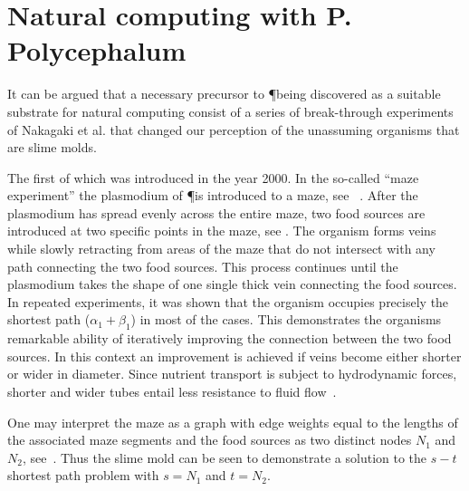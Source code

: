 \section{Natural computing with P. Polycephalum}

	It can be argued that a necessary precursor to \P being discovered as a suitable substrate for natural computing consist of a series of break-through experiments of Nakagaki et al. that changed our perception of the unassuming organisms that are slime molds.
	
	The first of which was introduced in the year 2000. In the so-called ``maze experiment'' the plasmodium of \P is introduced to a maze, see ~\cite{nakagaki2000intelligence}. After the plasmodium has spread evenly across the entire maze, two food sources are introduced at two specific points in the maze, see . The organism forms veins while slowly retracting from areas of the maze that do not intersect with any path connecting the two food sources. This process continues until the plasmodium takes the shape of one single thick vein connecting the food sources. In repeated experiments, it was shown that the organism occupies precisely the shortest path ($\alpha_1 + \beta_1$) in most of the cases. This demonstrates the organisms remarkable ability of iteratively improving the connection between the two food sources.
	In this context an improvement is achieved if veins become either shorter or wider in diameter. Since nutrient transport is subject to hydrodynamic forces, shorter and wider tubes entail less resistance to fluid flow~\cite{kamiya1959motive}.

	One may interpret the maze as a graph with edge weights equal to the lengths of the associated maze segments and the food sources as two distinct nodes $N_1$ and $N_2$, see~. Thus the slime mold \Pp can be seen to demonstrate a solution to the $s-t$ shortest path problem with $s=N_1$ and $t=N_2$.

